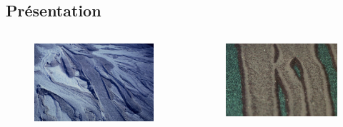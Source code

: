\documentclass[xcolor=dvipsnames]{beamer}
\begin{document}
\subsection{Présentation}
\begin{frame}

\begin{columns}

\begin{column}{6cm}

\begin{figure}[htp]
\centering
  \includegraphics[width=1.\linewidth]{img/st_helen}
  \label{fig:st_helen}
\end{figure}

\end{column}

\begin{column}{6cm}

\begin{figure}
  \centering
  \includegraphics[width=1.\linewidth]{img/small_scale}


\end{figure}
\end{column}
\end{columns}
\end{frame}
\end{document}
